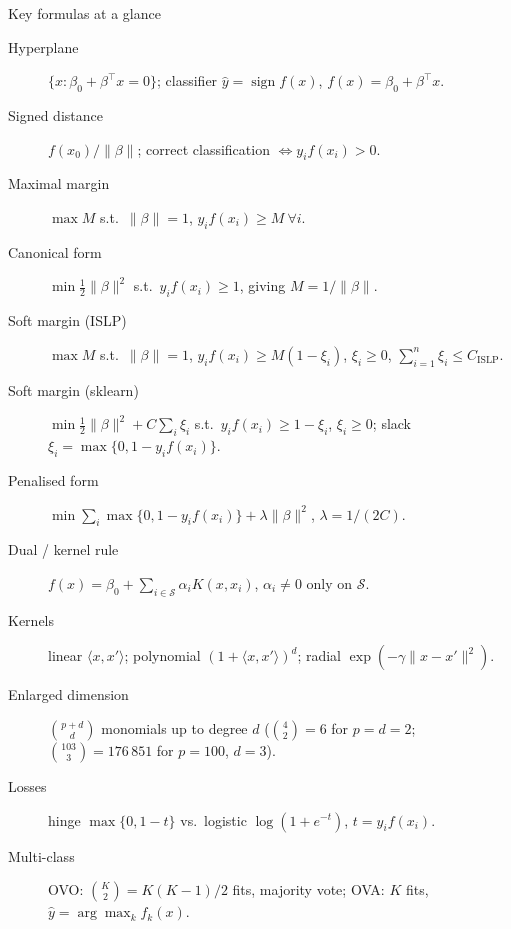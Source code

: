 \documentclass[aspectratio=169,11pt]{beamer}
\begin{document}
\begin{frame}{Key formulas at a glance}
  \scriptsize
  \begin{description}
    \item[Hyperplane] $\{x: \beta_0+\beta^\top x = 0\}$; classifier
      $\hat y = \operatorname{sign} f(x)$, $f(x)=\beta_0+\beta^\top x$.
    \item[Signed distance] $f(x_0)/\|\beta\|$; correct classification
      $\iff y_i f(x_i)>0$.
    \item[Maximal margin] $\max M$ s.t.\ $\|\beta\|=1$, $y_i f(x_i)\ge M\ \forall i$.
    \item[Canonical form] $\min \tfrac12\|\beta\|^2$ s.t.\ $y_i f(x_i)\ge 1$, giving $M=1/\|\beta\|$.
    \item[Soft margin (ISLP)] $\max M$ s.t.\ $\|\beta\|=1$, $y_i f(x_i)\ge M(1-\xi_i)$,
      $\xi_i\ge0$, $\sum_{i=1}^n \xi_i \le C_{\text{ISLP}}$.
    \item[Soft margin (sklearn)] $\min \tfrac12\|\beta\|^2 + C\sum_i \xi_i$ s.t.\
      $y_i f(x_i)\ge 1-\xi_i$, $\xi_i\ge0$; slack $\xi_i=\max\{0,1-y_if(x_i)\}$.
    \item[Penalised form] $\min \sum_i \max\{0,1-y_if(x_i)\} + \lambda\|\beta\|^2$, $\lambda = 1/(2C)$.
    \item[Dual / kernel rule] $f(x)=\beta_0+\sum_{i\in\mathcal S}\alpha_i K(x,x_i)$, $\alpha_i\ne0$ only on $\mathcal S$.
    \item[Kernels] linear $\langle x,x'\rangle$; polynomial $(1+\langle x,x'\rangle)^d$;
      radial $\exp(-\gamma\|x-x'\|^2)$.
    \item[Enlarged dimension] $\binom{p+d}{d}$ monomials up to degree $d$
      ($\binom{4}{2}=6$ for $p=d=2$; $\binom{103}{3}=176\,851$ for $p=100$, $d=3$).
    \item[Losses] hinge $\max\{0,1-t\}$ vs.\ logistic $\log(1+e^{-t})$, $t=y_if(x_i)$.
    \item[Multi-class] OVO: $\binom{K}{2}=K(K-1)/2$ fits, majority vote;
      OVA: $K$ fits, $\hat y = \arg\max_k f_k(x)$.
  \end{description}
\end{frame}
\end{document}
